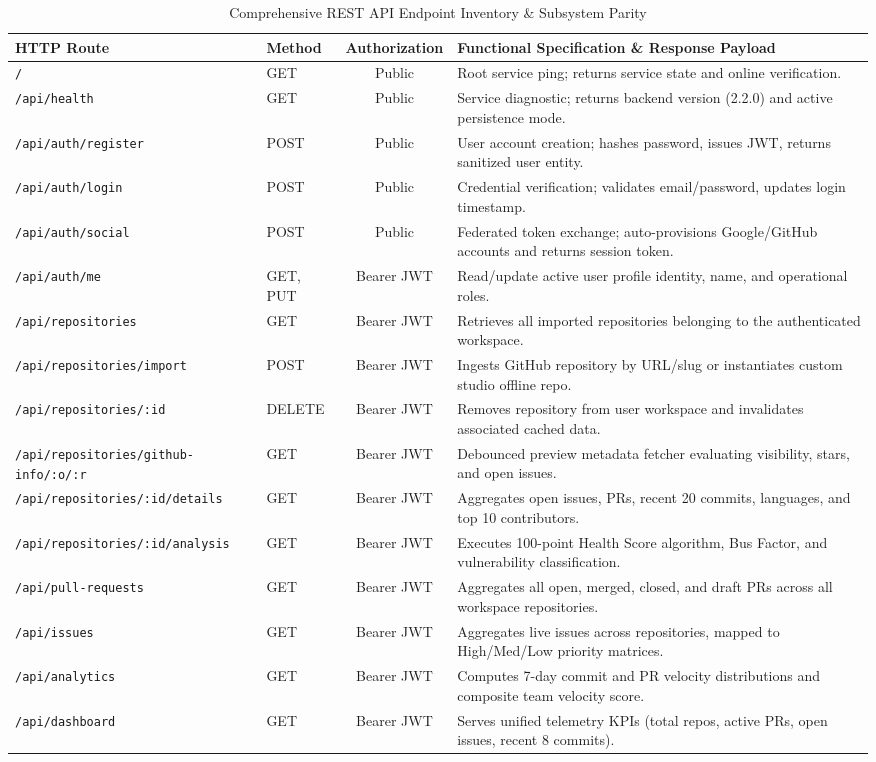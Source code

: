 \documentclass[conference]{IEEEtran}
\begin{document}
\begin{table}[t]
\caption{Comprehensive REST API Endpoint Inventory \& Subsystem Parity}
\label{tab:endpoints}
\centering
\small
\begin{tabularx}{\textwidth}{l l c X}
\toprule
\textbf{HTTP Route} & \textbf{Method} & \textbf{Authorization} & \textbf{Functional Specification \& Response Payload} \\
\midrule
\texttt{/} & GET & Public & Root service ping; returns service state and online verification. \\
\texttt{/api/health} & GET & Public & Service diagnostic; returns backend version (2.2.0) and active persistence mode. \\
\texttt{/api/auth/register} & POST & Public & User account creation; hashes password, issues JWT, returns sanitized user entity. \\
\texttt{/api/auth/login} & POST & Public & Credential verification; validates email/password, updates login timestamp. \\
\texttt{/api/auth/social} & POST & Public & Federated token exchange; auto-provisions Google/GitHub accounts and returns session token. \\
\texttt{/api/auth/me} & GET, PUT & Bearer JWT & Read/update active user profile identity, name, and operational roles. \\
\texttt{/api/repositories} & GET & Bearer JWT & Retrieves all imported repositories belonging to the authenticated workspace. \\
\texttt{/api/repositories/import} & POST & Bearer JWT & Ingests GitHub repository by URL/slug or instantiates custom studio offline repo. \\
\texttt{/api/repositories/:id} & DELETE & Bearer JWT & Removes repository from user workspace and invalidates associated cached data. \\
\texttt{/api/repositories/github-info/:o/:r} & GET & Bearer JWT & Debounced preview metadata fetcher evaluating visibility, stars, and open issues. \\
\texttt{/api/repositories/:id/details} & GET & Bearer JWT & Aggregates open issues, PRs, recent 20 commits, languages, and top 10 contributors. \\
\texttt{/api/repositories/:id/analysis} & GET & Bearer JWT & Executes 100-point Health Score algorithm, Bus Factor, and vulnerability classification. \\
\texttt{/api/pull-requests} & GET & Bearer JWT & Aggregates all open, merged, closed, and draft PRs across all workspace repositories. \\
\texttt{/api/issues} & GET & Bearer JWT & Aggregates live issues across repositories, mapped to High/Med/Low priority matrices. \\
\texttt{/api/analytics} & GET & Bearer JWT & Computes 7-day commit and PR velocity distributions and composite team velocity score. \\
\texttt{/api/dashboard} & GET & Bearer JWT & Serves unified telemetry KPIs (total repos, active PRs, open issues, recent 8 commits). \\
\bottomrule
\end{tabularx}
\end{table}
\end{document}
